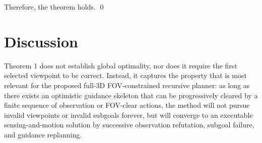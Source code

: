 \documentclass[11pt]{article}
\begin{document}
Therefore, the theorem holds. \qed

\section{Discussion}

Theorem 1 does not establish global optimality, nor does it require the first selected viewpoint to be correct. Instead, it captures the property that is most relevant for the proposed full-3D FOV-constrained recursive planner: as long as there exists an optimistic guidance skeleton that can be progressively cleared by a finite sequence of observation or FOV-clear actions, the method will not pursue invalid viewpoints or invalid subgoals forever, but will converge to an executable sensing-and-motion solution by successive observation refutation, subgoal failure, and guidance replanning.
\end{document}
